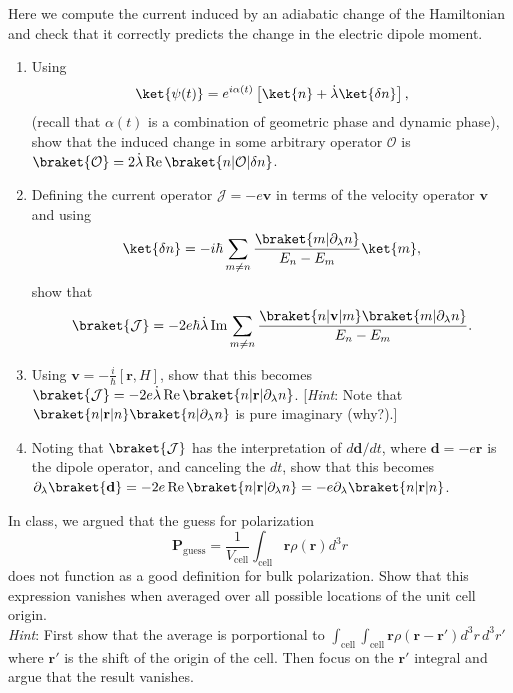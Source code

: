 \documentclass{jhwhw}
\DeclareMathOperator{\Rer}{Re}
\DeclareMathOperator{\Imr}{Im}
\begin{document}
Here we compute the current induced by an adiabatic change of the Hamiltonian and check that it correctly predicts the change in the electric dipole moment.
\begin{enumerate}
  \item Using
        \begin{equation}
          \label{eq:10}
          \ket{\psi(t)} = e^{i\alpha(t)}\left[ \ket{n} + \dot \lambda \ket{\delta n}\right],
        \end{equation}
        (recall that $\alpha(t)$ is a combination of geometric phase and dynamic phase), show that the induced change in some arbitrary operator $\mathcal O$ is $\braket{\mathcal O} = 2\dot \lambda \Rer \braket{n | \mathcal O | \delta n}$.
  \item Defining the current operator $\mathcal J = - e \mathbf v$ in terms of the velocity operator $\mathbf v$ and using
        \begin{equation}
          \label{eq:1}
          \ket{\delta n} = -i \hbar \sum_{m\neq n} \frac{\braket{m | \partial_{\lambda} n}}{E_{n} - E_{m}} \ket{m},
        \end{equation}
        show that
        \begin{equation}
          \label{eq:2}
          \braket{\mathcal J} = - 2 e \hbar \dot \lambda \Imr \sum_{m\neq n} \frac{\braket{n | \mathbf v | m}\braket{m | \partial_{\lambda} n }}{E_{n} - E_{m}}.
         \end{equation}
  \item Using $\mathbf v = -\frac{i}{\hbar} [\mathbf r, H]$, show that this becomes $\braket{\mathcal J} = -2 e \dot \lambda \Rer \braket{ n | \mathbf r | \partial_{\lambda} n }$. [\emph{Hint}: Note that $\braket{n|\mathbf r | n} \braket{n | \partial_{\lambda}n}$ is pure imaginary (why?).]
  \item Noting that $\braket{\mathcal J}$ has the interpretation of $d\mathbf{d}/dt$, where $\mathbf d = - e \mathbf r$ is the dipole operator, and canceling the $dt$, show that this becomes $\partial_{\lambda}\braket{\mathbf d} = - 2 e \Rer \braket{n | \mathbf r|\partial_{\lambda} n} = - e \partial_{\lambda} \braket{n | \mathbf r | n}$.
\end{enumerate}

In class, we argued that the guess for polarization
\begin{equation}
  \label{eq:5}
  \mathbf P_{\mathrm{guess}} = \frac1{V_{\mathrm{cell}}} \int_{\mathrm{cell}} \mathbf r \rho(\mathbf r) d^{3}r
\end{equation}
does not function as a good definition for bulk polarization. Show that this expression vanishes when averaged over all possible locations of the unit cell origin. \\
\emph{Hint}: First show that the average is porportional to $\int_{\mathrm{cell}} \int_{\mathrm{cell}} \mathbf r \rho(\mathbf r - \mathbf r') d^{3}r \, d^{3} r'$ where $\mathbf r'$ is the shift of the origin of the cell. Then focus on the $\mathbf r'$ integral and argue that the result vanishes.
\end{document}
